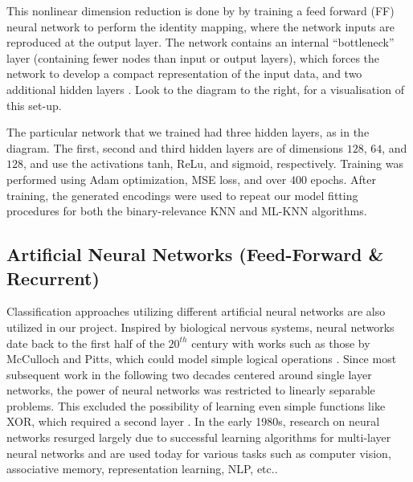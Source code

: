 \documentclass[11pt]{article}
\begin{document}
This nonlinear dimension reduction is done by by training a feed forward (FF) neural network to perform the identity mapping, where the network inputs are reproduced at the output layer. The network contains an internal “bottleneck” layer (containing fewer nodes than input or output layers), which forces the network to develop a compact representation of the input data, and two additional hidden layers \autocite{Kramer}. Look to the diagram to the right, for a visualisation of this set-up. 

The particular network that we trained had three hidden layers, as in the diagram. The first, second and third hidden layers are of dimensions $128$, $64$, and $128$, and use the activations tanh, ReLu, and sigmoid, respectively. Training was performed using Adam optimization, MSE loss, and over $400$ epochs. After training, the generated encodings were used to repeat our model fitting procedures for both the binary-relevance KNN and ML-KNN algorithms. 


\subsection{Artificial Neural Networks (Feed-Forward \& Recurrent)}
Classification approaches utilizing different artificial neural networks are also utilized in our project. Inspired by biological nervous systems, neural networks date back to the first half of the $20^{th}$ century with works such as those by McCulloch and Pitts, which could model simple logical operations \autocite{Piccinini}. Since most subsequent work in the following two decades centered around single layer networks, the power of neural networks was restricted to linearly separable problems. This excluded the possibility of learning even simple functions like XOR, which required a second layer \autocite{NNLM}. In the early 1980s, research on neural networks resurged largely due to successful learning algorithms for multi-layer neural networks and are used today for various tasks such as computer vision, associative memory, representation learning, NLP, etc..

\end{document}
